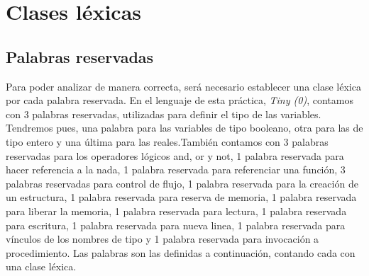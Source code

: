 \section{Clases léxicas}

\subsection{Palabras reservadas}

Para poder analizar de manera correcta, será necesario establecer una clase léxica por cada palabra reservada. En el lenguaje de
esta práctica, \textit{Tiny (0)}, contamos con 3 palabras reservadas, utilizadas para definir el tipo de las variables. Tendremos pues,
una palabra para las variables de tipo booleano, otra para las de tipo entero y una última para las reales.También contamos con
3 palabras reservadas para los operadores lógicos and, or y not, 1 palabra reservada para hacer referencia a la nada, 1 palabra reservada
para referenciar una función, 3 palabras reservadas para control de flujo, 1 palabra reservada para la creación de un estructura, 1 palabra reservada para reserva de memoria,
1 palabra reservada para liberar la memoria, 1 palabra reservada para lectura, 1 palabra reservada para escritura, 1 palabra reservada para nueva linea, 
1 palabra reservada para vínculos de los nombres de tipo y 1 palabra reservada para invocación a procedimiento. 
Las palabras son las definidas a continuación, contando cada con una clase léxica.

